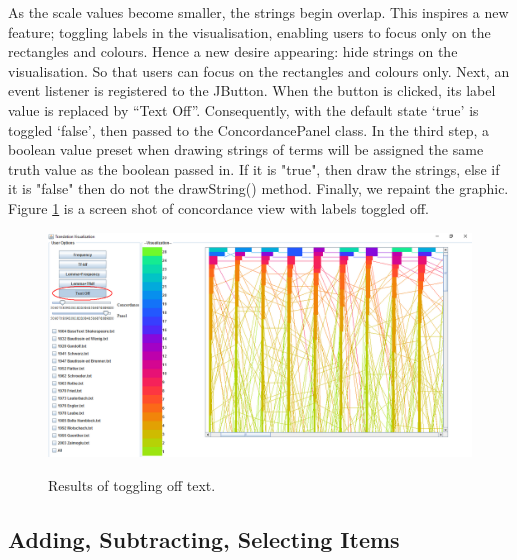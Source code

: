 As the scale values become smaller, the strings begin overlap. This inspires a new feature; toggling labels in the visualisation, enabling users to focus only on the rectangles and colours. Hence a new desire appearing: hide strings on the visualisation. So that users can focus on the rectangles and colours only. Next, an event listener is registered to the JButton. When the button is clicked, its label value is replaced by “Text Off”. Consequently, with the default state ‘true’ is toggled ‘false’, then passed to the ConcordancePanel class. In the third step, a boolean value preset when drawing strings of terms will be assigned the same truth value as the boolean passed in. If it is "true", then draw the strings, else if it is "false" then do not the drawString() method. Finally, we repaint the graphic. Figure \ref{fig:textOnOff} is a screen shot of concordance view with labels toggled off.

\begin{figure}[H]
	\centering	
	\includegraphics[width=\textwidth]{Figs/Text-On-Off}\\[1ex]
	\caption{Results of toggling off text.}
	\label{fig:textOnOff}
\end{figure} 

\subsection{Adding, Subtracting, Selecting Items}

